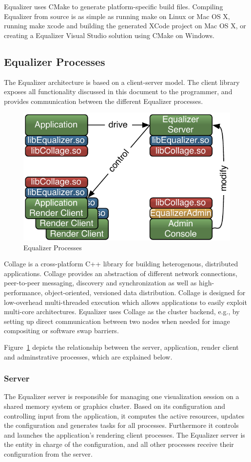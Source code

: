 \documentclass[10pt,a4]{scrartcl}
\newcommand{\fig}[1]{Figure~\ref{#1}}
\begin{document}
Equalizer uses CMake to generate platform-specific build files. Compiling
Equalizer from source is as simple as running \textsf{make} on Linux or Mac OS
X, running \textsf{make xcode} and building the generated XCode project on Mac
OS X, or creating a Equalizer Visual Studio solution using \textsf{CMake} on
Windows.

\subsection{Equalizer Processes}

The Equalizer architecture is based on a client-server model. The client
library exposes all functionality discussed in this document to the
programmer, and provides communication between the different Equalizer
processes.

\begin{figure}
  \includegraphics[width=.382\textwidth]{images/processes.pdf}
  {\caption{\label{fProcesses}Equalizer Processes}}
\end{figure}
Collage is a cross-platform C++ library for building heterogenous, distributed
applications. Collage provides an abstraction of different network connections,
peer-to-peer messaging, discovery and synchronization as well as
high-performance, object-oriented, versioned data distribution. Collage is
designed for low-overhead multi-threaded execution which allows applications to
easily exploit multi-core architectures. Equalizer uses Collage as the cluster
backend, e.g., by setting up direct communication between two nodes when needed
for image compositing or software swap barriers.

\fig{fProcesses} depicts the relationship between the server, application,
render client and adminstrative processes, which are explained below.

\subsubsection{Server}
The Equalizer server is responsible for managing one visualization session on a
shared memory system or graphics cluster. Based on its configuration and
controlling input from the application, it computes the active resources,
updates the configuration and generates tasks for all processes. Furthermore it
controls and launches the application's rendering client processes. The
Equalizer server is the entity in charge of the configuration, and all other
processes receive their configuration from the server.
\end{document}
